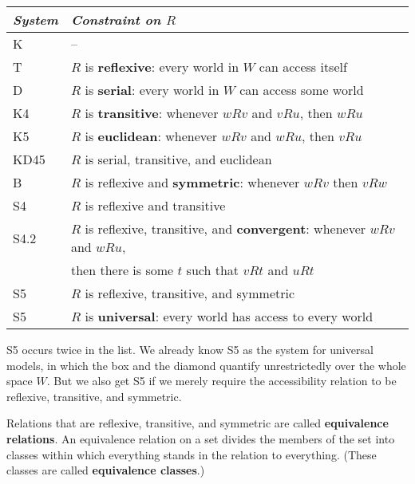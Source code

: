\bigskip
\label{table:systems}
\begin{tabular}{ll}
  \toprule
  \emph{System} & \emph{Constraint on $R$}\\
  \midrule
  K & --\\
  T & $R$ is \textbf{reflexive}: every world in $W$ can access itself\\
  D & $R$ is \textbf{serial}: every world in $W$ can access some world\\
  K4 & $R$ is \textbf{transitive}: whenever $wRv$ and $vRu$, then $wRu$\\
  K5 & $R$ is \textbf{euclidean}: whenever $wRv$ and $wRu$, then $vRu$\\
  KD45 & $R$ is serial, transitive, and euclidean\\
  B & $R$ is reflexive and \textbf{symmetric}: whenever $wRv$ then $vRw$\\
  S4 & $R$ is reflexive and transitive\\ 
  S4.2 & $R$ is reflexive, transitive, and \textbf{convergent}: whenever $wRv$ and $wRu$,\\[-0.5mm]
      & then there is some $t$ such that $vRt$ and $uRt$ \\ 
  S5 & $R$ is reflexive, transitive, and symmetric\\ 
  S5 & $R$ is \textbf{universal}: every world has access to every world\\
  \bottomrule
\end{tabular}

\bigskip


S5 occurs twice in the list. We already know S5 as the system for
universal models, in which the box and the diamond quantify unrestrictedly over
the whole space $W$. But we also get S5 if we merely require the accessibility
relation to be reflexive, transitive, and symmetric.

Relations that are reflexive, transitive, and symmetric are called
\textbf{equivalence relations}. An equivalence relation on a set divides the
members of the set into classes within which everything stands in the relation
to everything. (These classes are called \textbf{equivalence classes}.)

